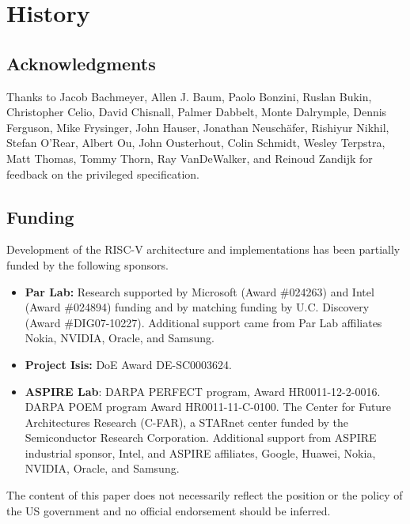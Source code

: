 \chapter{History}

\section*{Acknowledgments}

Thanks to Jacob Bachmeyer,
Allen J. Baum, Paolo Bonzini, Ruslan Bukin, Christopher Celio, David
Chisnall, Palmer Dabbelt, Monte Dalrymple, Dennis Ferguson, Mike
Frysinger, John Hauser, Jonathan Neusch{\"a}fer, Rishiyur Nikhil, Stefan O'Rear,
Albert Ou, John Ousterhout, Colin Schmidt, Wesley Terpstra, Matt
Thomas, Tommy Thorn, Ray VanDeWalker, and Reinoud Zandijk for feedback
on the privileged specification.

\section{Funding}

Development of the RISC-V architecture and implementations has been
partially funded by the following sponsors.
\begin{itemize}
\item {\bf Par Lab:} Research supported by Microsoft (Award \#024263)
  and Intel (Award \#024894) funding and by matching funding by
  U.C. Discovery (Award \#DIG07-10227). Additional support came from
  Par Lab affiliates Nokia, NVIDIA, Oracle, and Samsung.

\item {\bf Project Isis:} DoE Award DE-SC0003624.

\item {\bf ASPIRE Lab}: DARPA PERFECT program, Award HR0011-12-2-0016.
  DARPA POEM program Award HR0011-11-C-0100.  The Center for Future
  Architectures Research (C-FAR), a STARnet center funded by the
  Semiconductor Research Corporation.  Additional support from ASPIRE
  industrial sponsor, Intel, and ASPIRE affiliates, Google, Huawei,
  Nokia, NVIDIA, Oracle, and Samsung.
\end{itemize}

The content of this paper does not necessarily reflect the position or the
policy of the US government and no official endorsement should be
inferred. 
